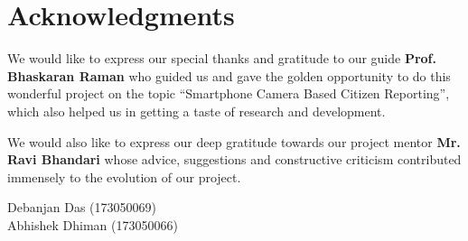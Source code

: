\cleardoublepage
{}
{}
\chapter*{Acknowledgments}
\vspace{0.25in}
We would like to express our special thanks and gratitude to our guide \textbf{Prof.  Bhaskaran Raman} who guided us and gave the golden opportunity to do this wonderful project on the topic ``Smartphone Camera Based Citizen Reporting'', which also helped us in getting a taste of research and development. 
\par We would also like to express our deep gratitude towards our project mentor \textbf{Mr. Ravi Bhandari} whose advice, suggestions and constructive criticism contributed immensely to the evolution of our project.
\vspace{0.8in}

\tab\tab\tab\tab\tab\tab\tab\tab\tab\tab Debanjan Das (173050069)\\
\tab\tab\tab\tab\tab\tab\tab\tab\tab\tab Abhishek Dhiman (173050066)\\
